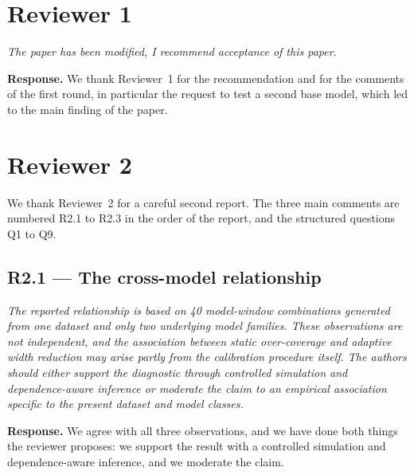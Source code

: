 \documentclass[11pt,a4paper]{article}
\newenvironment{revcomment}
  {\begin{mdframed}[backgroundcolor=quotebg,linecolor=quoterule,linewidth=0.4pt,
    innertopmargin=6pt,innerbottommargin=6pt,skipabove=8pt,skipbelow=8pt]\itshape}
  {\end{mdframed}}
\newcommand{\resp}{\textbf{Response.} }
\begin{document}
\section{Reviewer 1}

\begin{revcomment}
The paper has been modified, I recommend acceptance of this paper.
\end{revcomment}

\resp We thank Reviewer~1 for the recommendation and for the comments of the first round, in particular the request to test a second base model, which led to the main finding of the paper.

\section{Reviewer 2}

We thank Reviewer~2 for a careful second report. The three main comments are numbered R2.1 to R2.3 in the order of the report, and the structured questions Q1 to Q9.

\subsection*{R2.1 --- The cross-model relationship}

\begin{revcomment}
The reported relationship is based on 40 model-window combinations generated from one dataset and only two underlying model families. These observations are not independent, and the association between static over-coverage and adaptive width reduction may arise partly from the calibration procedure itself. The authors should either support the diagnostic through controlled simulation and dependence-aware inference or moderate the claim to an empirical association specific to the present dataset and model classes.
\end{revcomment}

\resp We agree with all three observations, and we have done both things the reviewer proposes: we support the result with a controlled simulation and dependence-aware inference, and we moderate the claim.
\end{document}
